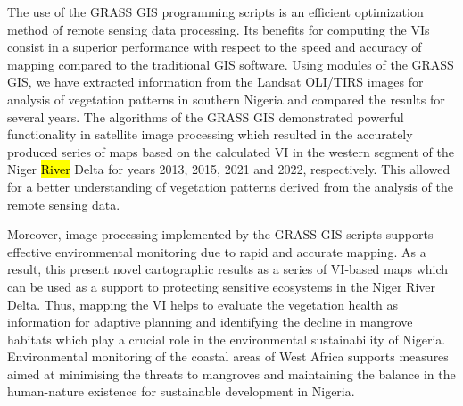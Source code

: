 \documentclass[jmse,article,submit,pdftex,moreauthors]{Definitions/mdpi}
\begin{document}
The use of the GRASS GIS programming scripts is an efficient optimization method of remote sensing data processing. Its benefits for computing the VIs consist in a superior performance with respect to the speed and accuracy of mapping compared to the traditional GIS software. Using modules of the GRASS GIS, we have extracted information from the Landsat OLI/TIRS images for analysis of vegetation patterns in southern Nigeria and compared the results for several years. The algorithms of the GRASS GIS demonstrated powerful functionality in satellite image processing which resulted in the accurately produced series of maps based on the calculated VI in the western segment of the Niger \hl{River} Delta for years 2013, 2015, 2021 and 2022, respectively. This allowed for a better understanding of vegetation patterns derived from the analysis of the remote sensing data. 

Moreover, image processing implemented by the GRASS GIS scripts supports effective environmental monitoring due to rapid and accurate mapping. As a result, this present novel cartographic results as a series of VI-based maps which can be used as a support to protecting sensitive ecosystems in the Niger River Delta. Thus, mapping the VI helps to evaluate the vegetation health as information for adaptive planning and identifying the decline in mangrove habitats which play a crucial role in the environmental sustainability of Nigeria. Environmental monitoring of the coastal areas of West Africa supports measures aimed at minimising the threats to mangroves and maintaining the balance in the human-nature existence for sustainable development in Nigeria. 



\end{document}

